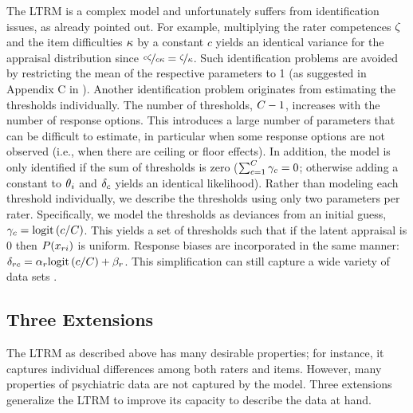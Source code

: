 \documentclass[a4paper,usenames,dvipsnames]{article}
\begin{document}
The LTRM is a complex model and unfortunately suffers from identification issues, as \AB{} already pointed out. For example, multiplying the rater competences $\zeta$ and the item difficulties $\kappa$ by a constant $c$ yields an identical variance for the appraisal distribution since $\nicefrac{c\zeta}{c\kappa} = \nicefrac{\zeta}{\kappa}$. Such identification problems are avoided by restricting the mean of the respective parameters to 1 (as suggested in Appendix C in \AB{}). Another identification problem originates from estimating the thresholds individually. The number of thresholds, $\Tncat-1$, increases with the number of response options. This introduces a large number of parameters that can be difficult to estimate, in particular when some response options are not observed (i.e., when there are ceiling or floor effects). In addition, the model is only identified if the sum of thresholds is zero ($\sum_{\Incat=1}^{\Tncat}\UnBiasedThreshold_\Incat = 0$; otherwise adding a constant to $\theta{}_i$ and $\delta_c$ yields an identical likelihood). Rather than modeling each threshold individually, we describe the thresholds using only two parameters per rater. Specifically, we model the thresholds as deviances from an initial guess, $\gamma_c = \text{logit}\left(c/C\right)$. This yields a set of thresholds such that if the latent appraisal is 0 then $P(x_{ri})$ is uniform. Response biases are incorporated in the same manner: $\delta_{rc} = \alpha_r\text{logit}\left(c/C\right) + \beta_r$. This simplification can still capture a wide variety of data sets \cite{Selker2019}. 

\subsection*{Three Extensions}

The LTRM as described above has many desirable properties; for instance, it captures individual differences among both raters and items. However, many properties of psychiatric data are not captured by the model. Three extensions generalize the LTRM to improve its capacity to describe the data at hand.
\end{document}
